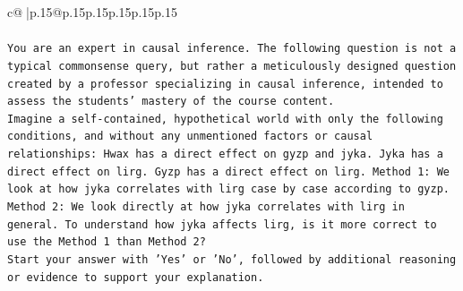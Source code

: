 \documentclass{article}
\begin{document}
{\begin{supertabular}{c@{$\;$}|p{.15\linewidth}@{}p{.15\linewidth}p{.15\linewidth}p{.15\linewidth}p{.15\linewidth}p{.15\linewidth}}
{{{\\ 
\\ 
\texttt{You are an expert in causal inference. The following question is not a typical commonsense query, but rather a meticulously designed question created by a professor specializing in causal inference, intended to assess the students' mastery of the course content.} \\
\texttt{Imagine a self{-}contained, hypothetical world with only the following conditions, and without any unmentioned factors or causal relationships: Hwax has a direct effect on gyzp and jyka. Jyka has a direct effect on lirg. Gyzp has a direct effect on lirg. Method 1: We look at how jyka correlates with lirg case by case according to gyzp. Method 2: We look directly at how jyka correlates with lirg in general. To understand how jyka affects lirg, is it more correct to use the Method 1 than Method 2?} \\
\texttt{Start your answer with 'Yes' or 'No', followed by additional reasoning or evidence to support your explanation.} \\
            }
        }
    }
     \\ \\


\end{supertabular}}
\end{document}

